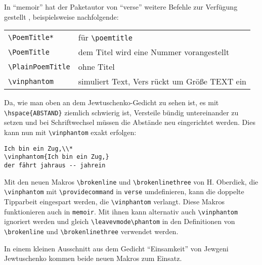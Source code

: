 In "`memoir"' hat der Paketautor von "`verse"' weitere Befehle
zur Verfügung gestellt \cite[Kap.\,14]{wilson:memoir}, beispielsweise nachfolgende:

\begin{tabular}{ll}
 \verb|\PoemTitle*| & für  \verb|\poemtitle|\\
 \verb|\PoemTitle|  & dem Titel wird eine Nummer vorangestellt\\
 \verb|\PlainPoemTitle| & ohne Titel \\
\verb|\vinphantom| & simuliert Text, Vers rückt um Größe TEXT ein \\
\end{tabular}

Da, wie man oben an dem Jewtuschenko-Gedicht zu sehen ist, es mit 
\verb|\hspace{ABSTAND}| ziemlich schwierig ist, Versteile bündig untereinander 
zu setzen und bei Schriftwechsel müssen die Abstände neu eingerichtet werden. Dies
kann nun 
mit \verb|\vinphantom| exakt erfolgen:

\begin{lstlisting}
Ich bin ein Zug,\\*
\vinphantom{Ich bin ein Zug,}
der fährt jahraus -- jahrein
\end{lstlisting}

Mit den neuen Makros \verb|\brokenline| und \verb|\brokenlinethree|
von H. Oberdiek, die \verb|\vinphantom| 
mit \verb|\providecommand| in \texttt{verse} umdefinieren, kann die doppelte
Tipparbeit eingespart werden, die \verb|\vinphantom| verlangt. Diese Makros 
funktionieren auch in \texttt{memoir}.
Mit ihnen kann alternativ auch \verb|\vinphantom| ignoriert werden und gleich 
\verb|\leavevmode\phantom| in den Definitionen von \verb|\brokenline| und 
\verb|\brokenlinethree| verwendet werden.

In einem kleinen Ausschnitt aus dem Gedicht "`Einsamkeit"' von Jewgeni Jewtuschenko
kommen beide neuen Makros zum Einsatz.


